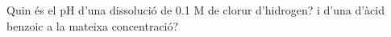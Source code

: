 \begin{exr}
Quin és el pH d'una dissolució de 0.1 M de clorur d'hidrogen? i d'una d'àcid benzoic a la mateixa concentració?
\end{exr}